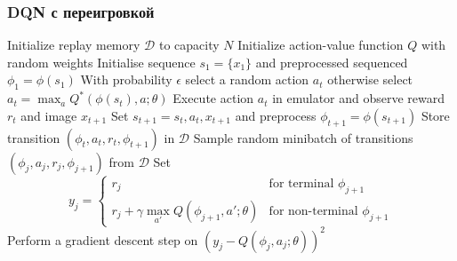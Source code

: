 \documentclass[default]{beamer}
\begin{document}
	\begin{frame}
		\frametitle{DQN с переигровкой}
		\small
			\begin{algorithmic}[1]
				\State Initialize replay memory $\mathcal D$ to capacity $N$ 
				\State Initialize action-value function $Q$ with random weights 
					\State Initialise sequence $s_1 = \{x_1\}$ and preprocessed sequenced $\phi_1 = \phi(s_1)$ 
						\State With probability $\epsilon$ select a random action $a_t$ 
						\State otherwise select $a_t = \max_a Q^*(\phi(s_t),a; \theta)$
						\State Execute action $a_t$ in emulator and observe reward $r_t$ and image $x_{t+1}$
						\State Set $s_{t+1} = s_t, a_t,x_{t+1}$ and preprocess $\phi_{t+1} = \phi(s_{t+1})$
						\State Store transition $(\phi_t, a_t, r_t,\phi_{t+1})$ in $\mathcal D$ \State Sample random minibatch of transitions $(\phi_j, a_j, r_j,\phi_{j+1})$ from $\mathcal D$
						\State Set 
						\[
							y_j =\begin{cases}
								r_j& \text{for terminal }\phi_{j+1} \\
								r_j +\gamma\max_{a'}Q(\phi_{j+1},a';\theta)& \text{for non-terminal }\phi_{j+1}
							\end{cases}		
						\]
						\State Perform a gradient descent step on $(y_j-Q(\phi_j, a_j;\theta))^2$
					\EndFor 
				\EndFor
			\end{algorithmic}
	\end{frame}											

%		
%				
	
\end{document}
